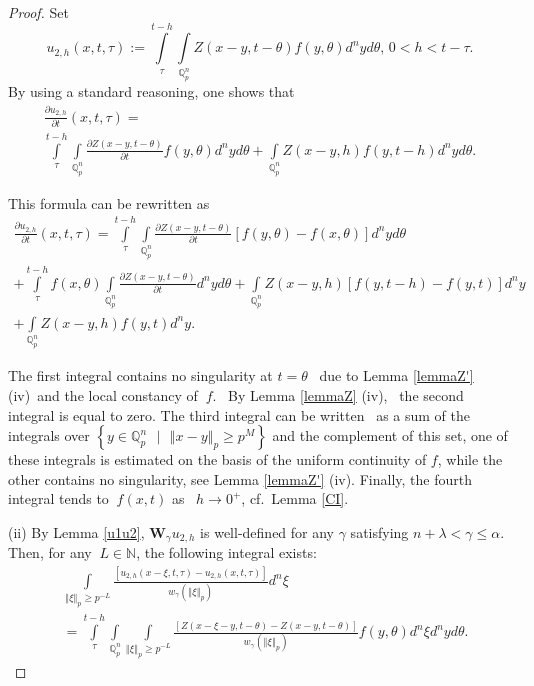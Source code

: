 \documentclass{amsart}\usepackage{amsfonts}
\theoremstyle{plain}
\numberwithin{equation}{section}
\begin{document}
\begin{proof}
Set\[
u_{2,h}(x,t,\tau):={\displaystyle\int\limits_{\tau}^{t-h}}
\underset{\mathbb{Q}_{p}^{n}}{\int}Z(x-y,t-\theta)f(y,\theta)d^{n}yd\theta\text{, }0<h<t-\tau.
\]
By using a standard reasoning, one shows that
\begin{multline*}
\frac{\partial u_{2,h}}{\partial t}(x,t,\tau)=\\%
{\displaystyle\int\limits_{\tau}^{t-h}}
\underset{\mathbb{Q}_{p}^{n}}{\int}\frac{\partial Z(x-y,t-\theta)}{\partial
t}f(y,\theta)d^{n}yd\theta+\underset{\mathbb{Q}_{p}^{n}}{\int}Z(x-y,h)f(y,t-h)d^{n}yd\theta.
\end{multline*}


This formula can be rewritten as\begin{multline*}
\frac{\partial u_{2,h}}{\partial t}(x,t,\tau)={\displaystyle\int\limits_{\tau}^{t-h}}
\underset{\mathbb{Q}_{p}^{n}}{\int}\frac{\partial Z(x-y,t-\theta)}{\partial
t}\left[  f(y,\theta)-f(x,\theta)\right]  d^{n}yd\theta\\
+{\displaystyle\int\limits_{\tau}^{t-h}}
f(x,\theta)\underset{\mathbb{Q}_{p}^{n}}{\int}\frac{\partial Z(x-y,t-\theta
)}{\partial t}d^{n}yd\theta+\underset{\mathbb{Q}_{p}^{n}}{\int}Z(x-y,h)\left[
f(y,t-h)-f(y,t)\right]  d^{n}y\\
+\underset{\mathbb{Q}_{p}^{n}}{\int}Z(x-y,h)f(y,t)d^{n}y.
\end{multline*}


The first integral contains no singularity at $t=\theta$ \ due to Lemma
\ref{lemmaZ'} (iv)\ and the local constancy of $\ f$. \ By Lemma \ref{lemmaZ}
(iv), \ the second integral is equal to zero. The third integral can be
written \ as a sum of the integrals over $\left\{  y\in\mathbb{Q}_{p}^{n}\text{ }|\text{ }\left\Vert x-y\right\Vert _{p}\geq p^{M}\right\}  $ and
the complement of this set, one of these integrals is estimated on the basis
of the uniform continuity of $f$, while the other contains no singularity, see
Lemma \ref{lemmaZ'} (iv). Finally, the fourth integral tends to $\ f(x,t)$ as
\ $h\rightarrow0^{+}$, cf.\ Lemma \ref{CI}.

(ii) By Lemma \ref{u1u2}, $\mathbf{W}_{\gamma}u_{2,h}$ is well-defined for any
$\gamma$ satisfying $n+\lambda<\gamma\leq\alpha$. Then, for any $\ L\in
\mathbb{N}$, the following integral exists:\begin{align}
&
{\displaystyle\int\limits_{\left\Vert \xi\right\Vert _{p}\geq p^{-L}}}
\frac{\left[  u_{2,h}(x-\xi,t,\tau)-u_{2,h}(x,t,\tau)\right]  }{w_{\gamma
}(\left\Vert \xi\right\Vert _{p})}d^{n}\xi\label{breaking}\\
&  ={\displaystyle\int\limits_{\tau}^{t-h}}
\underset{\mathbb{Q}_{p}^{n}}{\int}{\displaystyle\int\limits_{\left\Vert \xi\right\Vert _{p}\geq p^{-L}}}
\frac{\left[  Z(x-\xi-y,t-\theta)-Z(x-y,t-\theta)\right]  }{w_{\gamma
}(\left\Vert \xi\right\Vert _{p})}f(y,\theta)d^{n}\xi d^{n}yd\theta.\nonumber
\end{align}



\end{proof}
\end{document}
